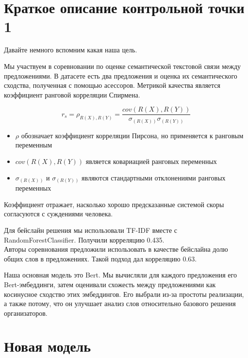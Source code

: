 \documentclass[12pt]{article}
\begin{document}
\tableofcontents
\newpage

\section{Краткое описание контрольной точки 1}

Давайте немного вспомним какая наша цель.

Мы участвуем в соревновании по оценке семантической текстовой связи между предложениями. В датасете есть два предложения и оценка их семантического сходства, полученная с помощью асессоров. Метрикой качества является коэффициент ранговой корреляции Спирмена.

$$
r_s = \rho_{R(X), R(Y)} = \frac{cov(R(X), R(Y))}{\sigma_{(R(X))} \sigma_{(R(Y))}}
$$
\begin{itemize}
    \item $\rho$ обозначает коэффициент корреляции Пирсона, но применяется к ранговым переменным
    \item $cov(R(X), R(Y))$ является ковариацией ранговых переменных
    \item $\sigma_{(R(X))}$ и $\sigma_{(R(Y))}$ являются стандартными отклонениями ранговых переменных
\end{itemize}
Коэффициент отражает, насколько хорошо предсказанные системой скоры согласуются с суждениями человека.

Для бейслайн решения мы использовали TF-IDF вместе с RandomForestClassifier. Получили корреляцию 0.435. \\
Авторы соревнования предложили использовать в качестве бейслайна долю общих слов в предложениях. Такой подход дал корреляцию 0.63.

Наша основная модель это Bert. Мы вычисляли для каждого предложения его Bert-эмбеддинги, затем оценивали схожесть между предложениями как косинусное сходство этих эмбеддингов. Его выбрали из-за простоты реализации, а также потому, что он улучшает анализ слов относительно базового решения организаторов. 

\newpage

\section{Новая модель}
\end{document}
